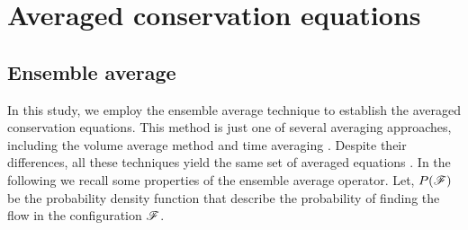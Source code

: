 \section{Averaged conservation equations}
\subsection{Ensemble average}
In this study, we employ the ensemble average technique to establish the averaged conservation equations. This method is just one of several averaging approaches, including the volume average method \citep{jackson1997locally} and time averaging \citep{ishii2010thermo}. Despite their differences, all these techniques yield the same set of averaged equations \citep{jackson1997locally,zhang1997momentum}.
In the following we recall some properties of the ensemble average operator. 
Let, $P(\mathscr{F})$ be the probability density function that describe the probability of finding the flow in the configuration $\mathscr{F}$. %

